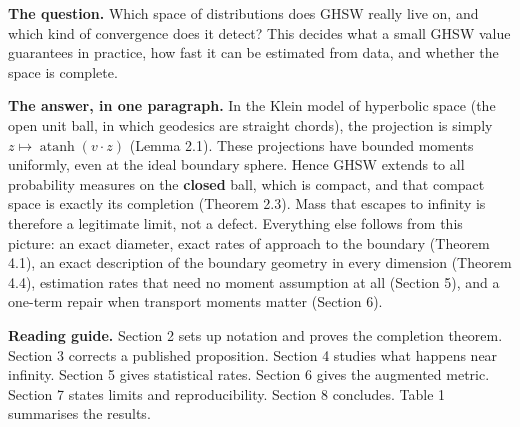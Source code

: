 \documentclass[
  british,
  11pt,
  a4paper,
]{article}
\begin{document}
\textbf{The question.} Which space of distributions does GHSW really
live on, and which kind of convergence does it detect? This decides what
a small GHSW value guarantees in practice, how fast it can be estimated
from data, and whether the space is complete.

\textbf{The answer, in one paragraph.} In the Klein model of hyperbolic
space (the open unit ball, in which geodesics are straight chords), the
projection is simply \(z\mapsto\operatorname{atanh}(v\cdot z)\) (Lemma
2.1). These projections have bounded moments uniformly, even at the
ideal boundary sphere. Hence GHSW extends to all probability measures on
the \textbf{closed} ball, which is compact, and that compact space is
exactly its completion (Theorem 2.3). Mass that escapes to infinity is
therefore a legitimate limit, not a defect. Everything else follows from
this picture: an exact diameter, exact rates of approach to the boundary
(Theorem 4.1), an exact description of the boundary geometry in every
dimension (Theorem 4.4), estimation rates that need no moment assumption
at all (Section 5), and a one-term repair when transport moments matter
(Section 6).

\textbf{Reading guide.} Section 2 sets up notation and proves the
completion theorem. Section 3 corrects a published proposition. Section
4 studies what happens near infinity. Section 5 gives statistical rates.
Section 6 gives the augmented metric. Section 7 states limits and
reproducibility. Section 8 concludes. Table 1 summarises the results.
\end{document}
